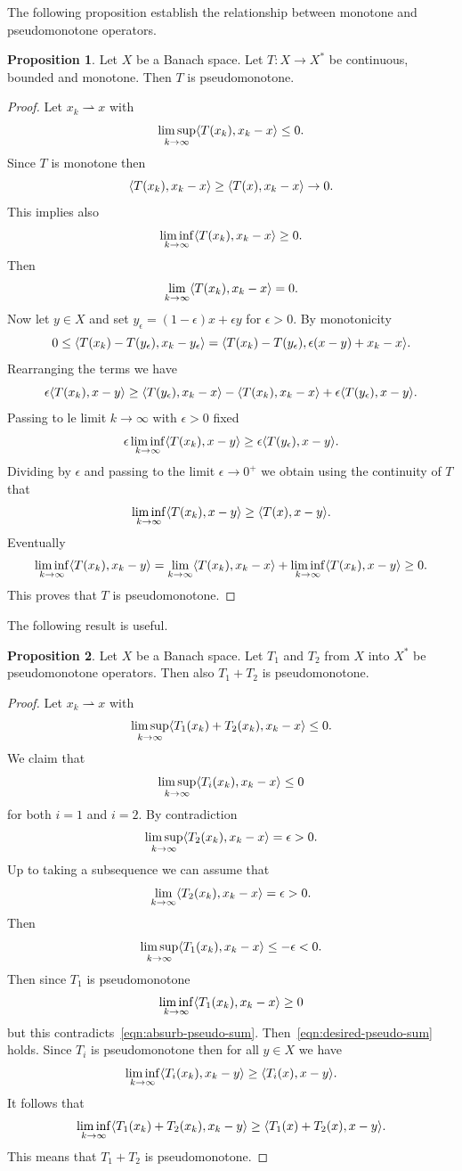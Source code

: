 \documentclass[a4paper,10pt,oneside]{amsbook}
\numberwithin{section}{chapter}
\numberwithin{equation}{chapter}
\theoremstyle{definition}
\newtheorem{prop}{Proposition}[chapter]
\DeclarePairedDelimiter{\dual}{\langle}{\rangle}
\begin{document}
The following proposition establish the relationship between monotone and pseudomonotone operators.
\begin{prop}
\label{prop:monotono-pseudomonotone}
Let $X$ be a Banach space. Let $T\colon X\to X^*$ be continuous, bounded and monotone. Then $T$ is pseudomonotone.
\end{prop}
\begin{proof}
Let $x_k\rightharpoonup x$ with
\[
\limsup_{k\to\infty}\dual{T(x_k),x_k-x}\le0.
\]
Since $T$ is monotone then
\[
\dual{T(x_k),x_k-x}\ge\dual{T(x),x_k-x}\to0.
\]
This implies also
\[
\liminf_{k\to\infty}\dual{T(x_k),x_k-x}\ge0.
\]
Then
\[
\lim_{k\to\infty}\dual{T(x_k),x_k-x}=0.
\]
Now let $y\in X$ and set $y_\epsilon=(1-\epsilon)x+\epsilon y$ for $\epsilon>0$. By monotonicity
\[
0\le\dual{T(x_k)-T(y_\epsilon),x_k-y_\epsilon}=\dual{T(x_k)-T(y_\epsilon),\epsilon(x-y)+x_k-x}.
\]
Rearranging the terms we have
\[
\epsilon\dual{T(x_k),x-y}\ge\dual{T(y_\epsilon),x_k-x}-\dual{T(x_k),x_k-x}+\epsilon\dual{T(y_\epsilon),x-y}.
\]
Passing to le limit $k\to\infty$ with $\epsilon>0$ fixed
\[
\epsilon\liminf_{k\to\infty}\dual{T(x_k),x-y}\ge\epsilon\dual{T(y_\epsilon),x-y}.
\]
Dividing by $\epsilon$ and passing to the limit $\epsilon\to0^+$ we obtain using the continuity of $T$ that
\[
\liminf_{k\to\infty}\dual{T(x_k),x-y}\ge\dual{T(x),x-y}.
\]
Eventually
\[
\liminf_{k\to\infty}\dual{T(x_k),x_k-y}=\lim_{k\to\infty}\dual{T(x_k),x_k-x}+\liminf_{k\to\infty}\dual{T(x_k),x-y}\ge0.
\]
This proves that $T$ is pseudomonotone.
\end{proof}
The following result is useful.
\begin{prop}
\label{prop:sum-pseudomonotone}
Let $X$ be a Banach space. Let $T_1$ and $T_2$ from $X$ into $X^*$ be pseudomonotone operators. Then also $T_1+T_2$ is pseudomonotone.
\end{prop}
\begin{proof}
Let $x_k\rightharpoonup x$ with
\[
\limsup_{k\to\infty}\dual{T_1(x_k)+T_2(x_k),x_k-x}\le0.
\]
We claim that
\begin{equation}
\label{eqn:desired-pseudo-sum}
\limsup_{k\to\infty}\dual{T_i(x_k),x_k-x}\le0
\end{equation}
for both $i=1$ and $i=2$. By contradiction
\[
\limsup_{k\to\infty}\dual{T_2(x_k),x_k-x}=\epsilon>0.
\]
Up to taking a subsequence we can assume that
\[
\lim_{k\to\infty}\dual{T_2(x_k),x_k-x}=\epsilon>0.
\]
Then
\begin{equation}
\label{eqn:absurb-pseudo-sum}
\limsup_{k\to\infty}\dual{T_1(x_k),x_k-x}\le-\epsilon<0.
\end{equation}
Then since $T_1$ is pseudomonotone
\[
\liminf_{k\to\infty}\dual{T_1(x_k),x_k-x}\ge0
\]
but this contradicts~\eqref{eqn:absurb-pseudo-sum}. Then~\eqref{eqn:desired-pseudo-sum} holds. Since $T_i$ is pseudomonotone then for all $y\in X$ we have
\[
\liminf_{k\to\infty}\dual{T_i(x_k),x_k-y}\ge\dual{T_i(x),x-y}.
\]
It follows that
\[
\liminf_{k\to\infty}\dual{T_1(x_k)+T_2(x_k),x_k-y}\ge\dual{T_1(x)+T_2(x),x-y}.
\]
This means that $T_1+T_2$ is pseudomonotone.
\end{proof}
\end{document}
